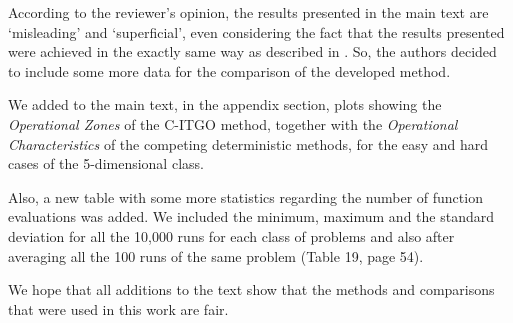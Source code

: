 \begin{revAns}
According to the reviewer's opinion, the results presented in the main text are `misleading' and `superficial', even considering the fact that the results presented were achieved in the exactly same way as described in \cite{NAT}. So, the authors decided to include some more data for the comparison of the developed method.

We added to the main text, in the appendix section, plots showing the \textit{Operational Zones} of the C-ITGO method, together with the \textit{Operational Characteristics} of the competing deterministic methods, for the easy and hard cases of the 5-dimensional class. 

Also, a new table with some more statistics regarding the number of function evaluations was added. We included the minimum, maximum and the standard deviation for all the 10,000 runs for each class of problems and also after averaging all the 100 runs of the same problem (Table 19, page 54).


We hope that all additions to the text show that the methods and comparisons that were used in this work are fair.



\end{revAns}